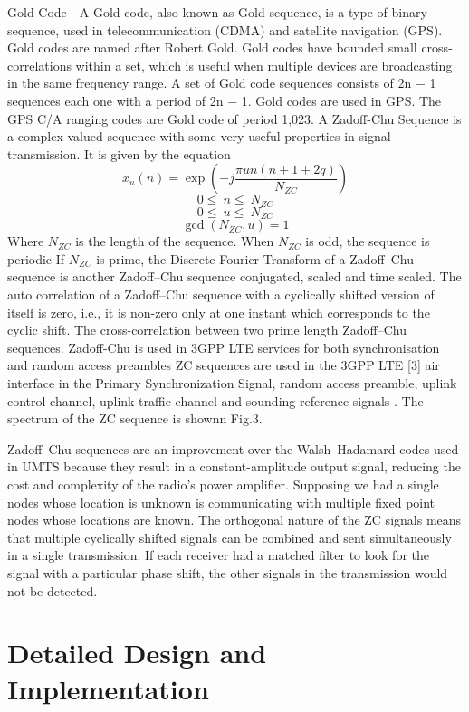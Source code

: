 \documentclass[]{final_report}
\begin{document}
	Gold Code - A Gold code, also known as Gold sequence, is a type of binary sequence, used in telecommunication (CDMA) and satellite navigation (GPS). Gold codes are named after Robert Gold. Gold codes have bounded small cross-correlations within a set, which is useful when multiple devices are broadcasting in the same frequency range. A set of Gold code sequences consists of 2n − 1 sequences each one with a period of 2n − 1. Gold codes are used in GPS. The GPS C/A ranging codes are Gold code of period 1,023.
	A Zadoff-Chu Sequence is a complex-valued sequence with some very useful properties in signal transmission. It is given by the equation
	\[ x_u\left(n\right)=\exp{\left(-j\frac{\pi un\left(n+1+2q\right)}{N_{ZC}}\right)} \]
	\[ 0\le\ n\le\ N_{ZC}\]
	\[ 0\le\ u\le\ N_{ZC} \]
	\[\gcd{\left(N_{ZC},u\right)}=1 \]
	Where $N_{ZC}$ is the length of the sequence. 
	When $N_{ZC}$ is odd, the sequence is periodic
	If $N_{ZC}$ is prime, the Discrete Fourier Transform of a Zadoff–Chu sequence is another Zadoff–Chu sequence conjugated, scaled and time scaled. The auto correlation of a Zadoff–Chu sequence with a cyclically shifted version of itself is zero, i.e., it is non-zero only at one instant which corresponds to the cyclic shift. The cross-correlation between two prime length Zadoff–Chu sequences.
	Zadoff-Chu is used in 3GPP LTE services for both synchronisation and random access preambles 
	ZC sequences are used in the 3GPP LTE [3] air interface{\cite{Remya2016zc}}
	in the Primary Synchronization Signal, random access
	preamble, uplink control channel, uplink traffic channel
	and sounding reference signals . The spectrum of the ZC
	sequence is shownn Fig.3.

	Zadoff–Chu sequences are an improvement over the Walsh–Hadamard codes used in UMTS because they result in a constant-amplitude output signal, reducing the cost and complexity of the radio's power amplifier.
	Supposing we had a single nodes whose location is unknown is communicating with multiple fixed point nodes whose locations are known. 
	The orthogonal nature of the ZC signals means that multiple cyclically shifted signals can be combined and sent simultaneously in a single transmission. If each receiver had a matched filter to look for the signal with a particular phase shift, the other signals in the transmission would not be detected. 
	
\chapter{\label{chapter4} Detailed Design and Implementation}
\end{document}
